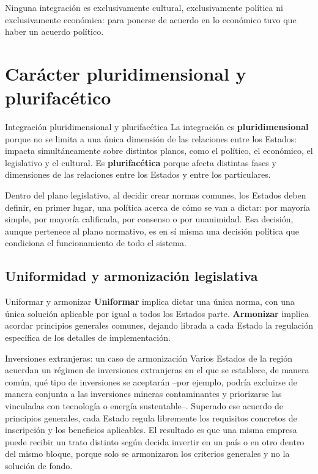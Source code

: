 \documentclass[12pt,oneside]{book}
\begin{document}
\begin{importante}
Ninguna integración es exclusivamente cultural, exclusivamente política ni exclusivamente económica: para ponerse de acuerdo en lo económico tuvo que haber un acuerdo político.
\end{importante}

\section{Carácter pluridimensional y plurifacético}

\begin{definicion}{Integración pluridimensional y plurifacética}
La integración es \textbf{pluridimensional} porque no se limita a una única dimensión de las relaciones entre los Estados: impacta simultáneamente sobre distintos planos, como el político, el económico, el legislativo y el cultural. Es \textbf{plurifacética} porque afecta distintas fases y dimensiones de las relaciones entre los Estados y entre los particulares.
\end{definicion}

Dentro del plano legislativo, al decidir crear normas comunes, los Estados deben definir, en primer lugar, una política acerca de cómo se van a dictar: por mayoría simple, por mayoría calificada, por consenso o por unanimidad. Esa decisión, aunque pertenece al plano normativo, es en sí misma una decisión política que condiciona el funcionamiento de todo el sistema.

\subsection{Uniformidad y armonización legislativa}

\begin{definicion}{Uniformar y armonizar}
\textbf{Uniformar} implica dictar una única norma, con una única solución aplicable por igual a todos los Estados parte. \textbf{Armonizar} implica acordar principios generales comunes, dejando librada a cada Estado la regulación específica de los detalles de implementación.
\end{definicion}

\begin{ejemplo}{Inversiones extranjeras: un caso de armonización}
Varios Estados de la región acuerdan un régimen de inversiones extranjeras en el que se establece, de manera común, qué tipo de inversiones se aceptarán --por ejemplo, podría excluirse de manera conjunta a las inversiones mineras contaminantes y priorizarse las vinculadas con tecnología o energía sustentable--. Superado ese acuerdo de principios generales, cada Estado regula libremente los requisitos concretos de inscripción y los beneficios aplicables. El resultado es que una misma empresa puede recibir un trato distinto según decida invertir en un país o en otro dentro del mismo bloque, porque solo se armonizaron los criterios generales y no la solución de fondo.
\end{ejemplo}
\end{document}
